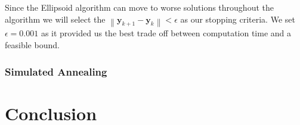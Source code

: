 \documentclass[12pt]{article}
\theoremstyle{plain}
\theoremstyle{definition}
\newcommand{\norm}[1]{\left\lVert#1\right\rVert}
\begin{document}
Since the Ellipsoid algorithm can move to worse solutions throughout the algorithm we will select the $\norm{\mathbf{y}_{k+1} - \mathbf{y}_k} < \epsilon$ as our stopping criteria. We set $\epsilon = 0.001$ as it provided us the best trade off between computation time and a feasible bound.

\subsubsection{Simulated Annealing}

\section{Conclusion}
\end{document}
